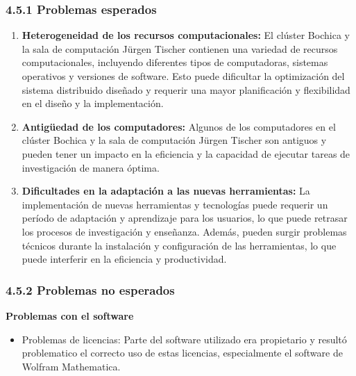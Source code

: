 \begin{spacing}{1.5}
  \subsubsection{4.5.1 Problemas esperados}

  \begin{enumerate}
    \item \textbf{Heterogeneidad de los recursos computacionales:} El clúster
          Bochica y la sala de computación Jürgen Tischer contienen una
          variedad de
          recursos computacionales, incluyendo diferentes tipos de
          computadoras, sistemas
          operativos y versiones de software. Esto puede dificultar la
          optimización del
          sistema distribuido diseñado y requerir una mayor planificación y
          flexibilidad
          en el diseño y la implementación.
    \item \textbf{Antigüedad de los computadores:} Algunos de los computadores
          en el clúster Bochica y la sala de computación Jürgen Tischer son
          antiguos y
          pueden tener un impacto en la eficiencia y la capacidad de ejecutar
          tareas de
          investigación de manera óptima.
    \item \textbf{Dificultades en la adaptación a las nuevas herramientas:} La
          implementación de nuevas herramientas y tecnologías puede requerir un
          período
          de adaptación y aprendizaje para los usuarios, lo que puede retrasar
          los
          procesos de investigación y enseñanza. Además, pueden surgir
          problemas técnicos
          durante la instalación y configuración de las herramientas, lo que
          puede
          interferir en la eficiencia y productividad.
  \end{enumerate}

  \subsubsection{4.5.2 Problemas no esperados}

  \textbf{Problemas con el software}

  \begin{itemize}
    \item Problemas de licencias: Parte del software utilizado era
          propietario y resultó problematico el correcto uso de estas
          licencias,
          especialmente el software de Wolfram Mathematica.
  \end{itemize}


\end{spacing}
